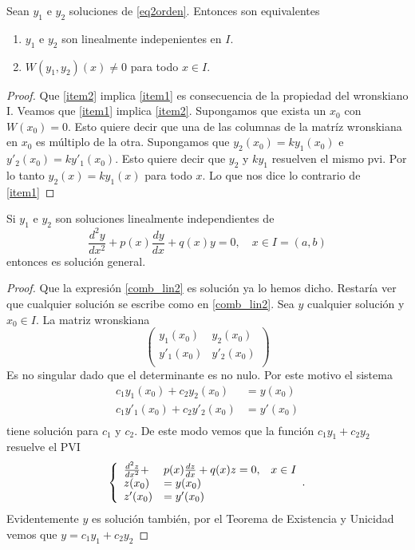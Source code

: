 \begin{teorema}
 Sean $y_1$ e $y_2$ soluciones de \eqref{eq2orden}. Entonces son equivalentes
\begin{enumerate}
\item\label{item1} $y_1$ e $y_2$ son linealmente indepenientes en $I$.
\item\label{item2} $W(y_1,y_2)(x)\neq 0$ para todo $x\in I$.
\end{enumerate}
\end{teorema}


\begin{proof} Que \ref{item2} implica \ref{item1} es consecuencia de la propiedad del wronskiano I.
Veamos que \ref{item1} implica \ref{item2}. Supongamos que exista un $x_0$ con $W(x_0)=0$. Esto quiere decir que una de las columnas
de la matríz wronskiana en $x_0$ es múltiplo de la otra. Supongamos que $y_2(x_0)=ky_1(x_0)$ e $y'_2(x_0)=ky'_1(x_0)$. Esto quiere decir que $y_2$ y $ky_1$
resuelven el mismo pvi. Por lo tanto $y_2(x)=ky_1(x)$ para todo $x$. Lo que nos dice lo contrario de \ref{item1}
\end{proof}


\begin{teorema}
 Si $y_1$ e $y_2$ son soluciones linealmente independientes de
\[\frac{d^2y}{dx^2}+p(x)\frac{dy}{dx}+q(x)y=0,\quad x\in I=(a,b)\]
entonces
es solución general.
\end{teorema}

\begin{proof} Que la expresión \eqref{comb_lin2} es solución ya lo hemos dicho. Restaría ver que cualquier solución se escribe como en \eqref{comb_lin2}.
Sea $y$ cualquier solución y $x_0\in I$. La matriz wronskiana
\[\begin{pmatrix}
y_1(x_0) & y_2(x_0)\\
y'_1(x_0) & y'_2(x_0)\\
\end{pmatrix}
\]
Es no singular dado que el determinante es no nulo. Por este motivo el sistema
\[ \begin{split}
c_1 y_1(x_0) + c_2y_2(x_0) &=y(x_0)\\
c_1y'_1(x_0) + c_2y'_2(x_0) &=y'(x_0)\\
\end{split}
\]
tiene solución para $c_1$ y $c_2$. De este modo vemos que la función $c_1y_1+c_2y_2$ resuelve el PVI
\[\left\{
\begin{array}{l l l}
\frac{d^2z}{dx^2}+&p(x)\frac{dz}{dx}+q(x)z=0,&x\in I\\
z(x_0)&=y(x_0)&\\
z'(x_0)&=y'(x_0)&\\
\end{array}.\right.
\]
Evidentemente $y$ es solución también, por el Teorema de Existencia y Unicidad vemos que $y=c_1y_1+c_2y_2$ \end{proof}

